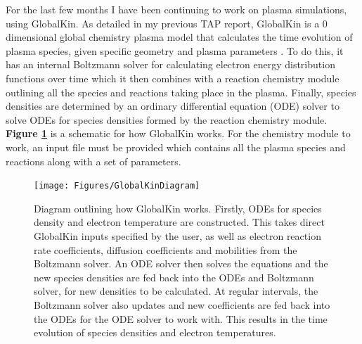 \documentclass[11pt, oneside]{article}   	%
\begin{document}
For the last few months I have been continuing to work on plasma simulations, using GlobalKin.
As detailed in my previous TAP report, GlobalKin is a 0 dimensional global chemistry plasma model that calculates the time evolution of plasma species, given specific geometry and plasma parameters \cite{Stafford2004O2}.
To do this, it has an internal Boltzmann solver for calculating electron energy distribution functions over time which it then combines with a reaction chemistry module outlining all the species and reactions taking place in the plasma.
Finally, species densities are determined by an ordinary differential equation (ODE) solver to solve ODEs for species densities formed by the reaction chemistry module.
\textbf{Figure \ref{fig:GlobalKin}} is a schematic for how GlobalKin works.
For the chemistry module to work, an input file must be provided which contains all the plasma species and reactions along with a set of parameters.

%
%
%


\begin{figure}
\texttt{[image: Figures/GlobalKinDiagram]}
\caption{Diagram outlining how GlobalKin works. Firstly, ODEs for species density and electron temperature are constructed. This takes direct GlobalKin inputs specified by the user, as well as electron reaction rate coefficients, diffusion coefficients and mobilities from the Boltzmann solver. An ODE solver then solves the equations and the new species densities are fed back into the ODEs and Boltzmann solver, for new densities to be calculated. At regular intervals, the Boltzmann solver also updates and new coefficients are fed back into the ODEs for the ODE solver to work with. This results in the time evolution of species densities and electron temperatures.}
\label{fig:GlobalKin}
\end{figure}
\end{document}
